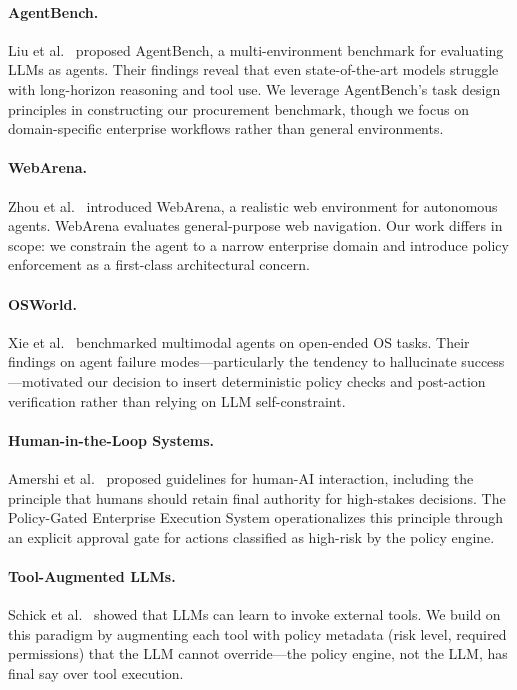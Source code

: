 \documentclass[11pt,a4paper]{article}
\begin{document}
\paragraph{AgentBench.} Liu et al.~\cite{liu2023agentbench} proposed AgentBench, a multi-environment benchmark for evaluating LLMs as agents. Their findings reveal that even state-of-the-art models struggle with long-horizon reasoning and tool use. We leverage AgentBench's task design principles in constructing our procurement benchmark, though we focus on domain-specific enterprise workflows rather than general environments.

\paragraph{WebArena.} Zhou et al.~\cite{zhou2023webarena} introduced WebArena, a realistic web environment for autonomous agents. WebArena evaluates general-purpose web navigation. Our work differs in scope: we constrain the agent to a narrow enterprise domain and introduce policy enforcement as a first-class architectural concern.

\paragraph{OSWorld.} Xie et al.~\cite{xie2024osworld} benchmarked multimodal agents on open-ended OS tasks. Their findings on agent failure modes---particularly the tendency to hallucinate success---motivated our decision to insert deterministic policy checks and post-action verification rather than relying on LLM self-constraint.

\paragraph{Human-in-the-Loop Systems.} Amershi et al.~\cite{amershi2019guidelines} proposed guidelines for human-AI interaction, including the principle that humans should retain final authority for high-stakes decisions. The Policy-Gated Enterprise Execution System operationalizes this principle through an explicit approval gate for actions classified as high-risk by the policy engine.

\paragraph{Tool-Augmented LLMs.} Schick et al.~\cite{schick2023toolformer} showed that LLMs can learn to invoke external tools. We build on this paradigm by augmenting each tool with policy metadata (risk level, required permissions) that the LLM cannot override---the policy engine, not the LLM, has final say over tool execution.
\end{document}
